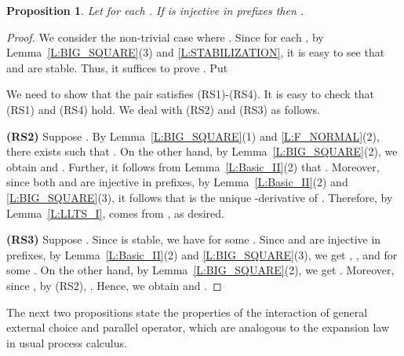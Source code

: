 \documentclass{elsarticle}
\theoremstyle{plain}
\newtheorem{proposition}[theorem]{Proposition}
\theoremstyle{definition}
\begin{document}
\begin{proposition}\label{L:MULTIPLE_II}
Let  for each .
  If  is injective in prefixes then .
\end{proposition}
\begin{proof}
We consider the non-trivial case where .
Since  for each , by Lemma~\ref{L:BIG_SQUARE}(3) and \ref{L:STABILIZATION}, it is easy to see that  and  are stable.
Thus, it suffices to prove . Put

We need to show that the pair  satisfies (RS1)-(RS4).
It is easy to check that (RS1) and (RS4) hold. We deal with (RS2) and (RS3) as follows.

\textbf{(RS2)} Suppose .
By Lemma~\ref{L:BIG_SQUARE}(1) and \ref{L:F_NORMAL}(2), there exists  such that .
On the other hand, by Lemma~\ref{L:BIG_SQUARE}(2), we obtain  and .
Further, it follows from Lemma~\ref{L:Basic_II}(2) that .
Moreover, since both  and  are injective in prefixes, by Lemma~\ref{L:Basic_II}(2) and \ref{L:BIG_SQUARE}(3), it follows that  is the unique -derivative of . Therefore, by Lemma~\ref{L:LLTS_I},  comes from , as desired.

\textbf{(RS3)} Suppose .
Since  is stable, we have  for some .
Since  and  are injective in prefixes, by Lemma~\ref{L:Basic_II}(2) and \ref{L:BIG_SQUARE}(3), we get , ,  and  for some .
On the other hand, by Lemma~\ref{L:BIG_SQUARE}(2), we get .
Moreover, since , by (RS2), .
Hence, we obtain  and .
\end{proof}

The next two propositions state the properties of the interaction of general external choice and parallel operator, which are analogous to the expansion law in usual process calculus.
\end{document}
